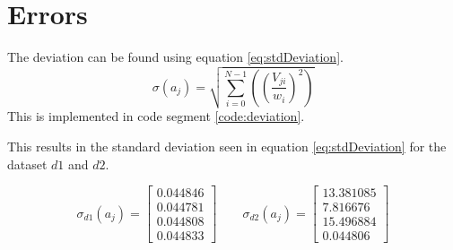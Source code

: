 \section{Errors}
The deviation can be found using equation \ref{eq:stdDeviation}.
\[
\sigma\left(a_j\right) = \sqrt{ \sum_{i=0}^{N-1} \left( \left( \frac{V_{ji}}{w_i}\right)^2\right) }
\label{eq:stdDeviation}
\]
This is implemented in code segment \ref{code:deviation}.


This results in the standard deviation seen in equation \ref{eq:stdDeviation} for the dataset $d1$ and $d2$.

\begin{equation}
\sigma_{d1}\left(a_j\right) = 
    \left[
        \begin{array}{c}
        0.044846 \\
        0.044781 \\
        0.044808 \\
        0.044833
        \end{array}
    \right]
\qquad
\sigma_{d2}\left(a_j\right) = 
    \left[
        \begin{array}{c}
        13.381085\\ 
        7.816676\\ 
        15.496884\\ 
        0.044806
        \end{array}
    \right]
\label{eq:stdDeviation}
\end{equation}